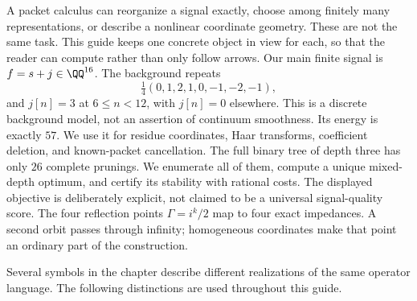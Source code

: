 A packet calculus can reorganize a signal exactly, choose among finitely many representations, or describe a nonlinear coordinate geometry. These are not the same task. This guide keeps one concrete object in view for each, so that the reader can compute rather than only follow arrows.
Our main finite signal is $f=s+j\in\QQ^{16}$. The background repeats
\[
\tfrac14(0,1,2,1,0,-1,-2,-1),
\]
and $j[n]=3$ at $6\le n<12$, with $j[n]=0$ elsewhere. This is a discrete background model, not an assertion of continuum smoothness. Its energy is exactly $57$. We use it for residue coordinates, Haar transforms, coefficient deletion, and known-packet cancellation.
The full binary tree of depth three has only $26$ complete prunings. We enumerate all of them, compute a unique mixed-depth optimum, and certify its stability with rational costs. The displayed objective is deliberately explicit, not claimed to be a universal signal-quality score.
The four reflection points $\Gamma=i^k/2$ map to four exact impedances. A second orbit passes through infinity; homogeneous coordinates make that point an ordinary part of the construction.

Several symbols in the chapter describe different realizations of the same operator language. The following distinctions are used throughout this guide.

